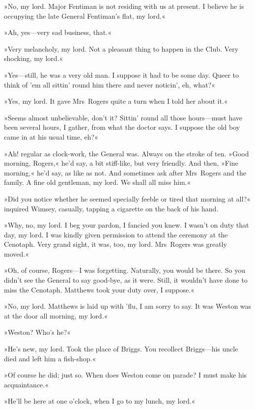 »No, my lord. Major Fentiman is not residing with us at present. I believe he is occupying the late General Fentiman's flat, my lord.«

»Ah, yes—very sad business, that.«

»Very melancholy, my lord. Not a pleasant thing to happen in the Club. Very shocking, my lord.«

»Yes—still, he was a very old man. I suppose it had to be some day. Queer to think of 'em all sittin' round him there and never noticin', eh, what?«

»Yes, my lord. It gave Mrs~Rogers quite a turn when I told her about it.«

»Seems almost unbelievable, don't it? Sittin' round all those hours—must have been several hours, I gather, from what the doctor says. I suppose the old boy came in at his usual time, eh?«

»Ah! regular as clock-work, the General was. Always on the stroke of ten. »Good morning, Rogers,« he'd say, a bit stiff-like, but very friendly. And then, »Fine morning,« he'd say, as like as not. And sometimes ask after Mrs~Rogers and the family. A fine old gentleman, my lord. We shall all miss him.«

»Did you notice whether he seemed specially feeble or tired that morning at all?« inquired Wimsey, casually, tapping a cigarette on the back of his hand.

»Why, no, my lord. I beg your pardon, I fancied you knew. I wasn't on duty that day, my lord. I was kindly given permission to attend the ceremony at the Cenotaph. Very grand sight, it was, too, my lord. Mrs~Rogers was greatly moved.«

»Oh, of course, Rogers—I was forgetting. Naturally, you would be there. So you didn't see the General to say good-bye, as it were. Still, it wouldn't have done to miss the Cenotaph. Matthews took your duty over, I suppose.«

»No, my lord. Matthews is laid up with 'flu, I am sorry to say. It was Weston was at the door all morning, my lord.«

»Weston? Who's he?«

»He's new, my lord. Took the place of Briggs. You recollect Briggs—his uncle died and left him a fish-shop.«

»Of course he did; just so. When does Weston come on parade? I must make his acquaintance.«

»He'll be here at one o'clock, when I go to my lunch, my lord.«

